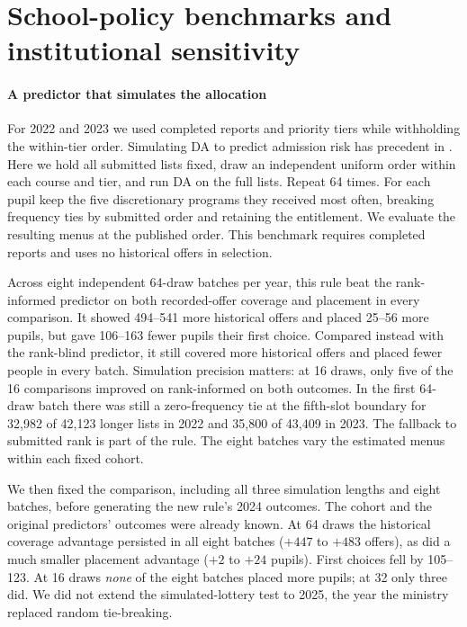 \section{School-policy benchmarks and institutional sensitivity}\label{sec:school-sensitivity}
\paragraph{A predictor that simulates the allocation}
For 2022 and 2023 we used completed reports and priority tiers while withholding the within-tier order. Simulating DA to predict admission risk has precedent in \citet[online appendix, Sec.~F.1]{smartplatforms}. Here we hold all submitted lists fixed, draw an independent uniform order within each course and tier, and run DA on the full lists. Repeat 64 times. For each pupil keep the five discretionary programs they received most often, breaking frequency ties by submitted order and retaining the entitlement. We evaluate the resulting menus at the published order. This benchmark requires completed reports and uses no historical offers in selection.

Across eight independent 64-draw batches per year, this rule beat the rank-informed predictor on both recorded-offer coverage and placement in every comparison. It showed 494--541 more historical offers and placed 25--56 more pupils, but gave 106--163 fewer pupils their first choice. Compared instead with the rank-blind predictor, it still covered more historical offers and placed fewer people in every batch. Simulation precision matters: at 16 draws, only five of the 16 comparisons improved on rank-informed on both outcomes. In the first 64-draw batch there was still a zero-frequency tie at the fifth-slot boundary for 32,982 of 42,123 longer lists in 2022 and 35,800 of 43,409 in 2023. The fallback to submitted rank is part of the rule. The eight batches vary the estimated menus within each fixed cohort.

We then fixed the comparison, including all three simulation lengths and eight batches, before generating the new rule's 2024 outcomes. The cohort and the original predictors' outcomes were already known. At 64 draws the historical coverage advantage persisted in all eight batches ($+447$ to $+483$ offers), as did a much smaller placement advantage ($+2$ to $+24$ pupils). First choices fell by 105--123. At 16 draws \emph{none} of the eight batches placed more pupils; at 32 only three did. We did not extend the simulated-lottery test to 2025, the year the ministry replaced random tie-breaking.

